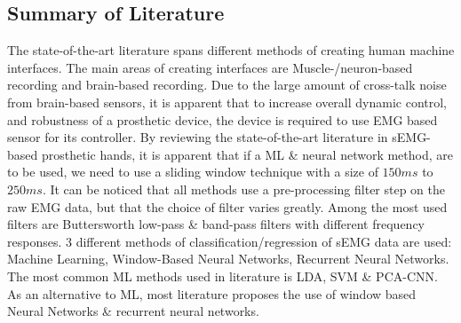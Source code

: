\documentclass[../main.tex]{subfiles}
\begin{document}


\subsection{Summary of Literature}

The state-of-the-art literature spans different methods of creating human machine interfaces.
The main areas of creating interfaces are Muscle-/neuron-based recording and brain-based recording.
Due to the large amount of cross-talk noise from brain-based sensors, it is apparent that to increase overall dynamic control, and robustness of a prosthetic device, the device is required to use EMG based sensor for its controller.
By reviewing the state-of-the-art literature in sEMG-based prosthetic hands, it is apparent that if a \gls{ML} \& neural network method, are to be used, we need to use a sliding window technique with a size of $150ms$ to $250ms$.
It can be noticed that all methods use a pre-processing filter step on the raw EMG data, but that the choice of filter varies greatly.
Among the most used filters are Buttersworth low-pass \& band-pass filters with different frequency responses.
3 different methods of classification/regression of sEMG data are used: Machine Learning, Window-Based Neural Networks, Recurrent Neural Networks.
The most common ML methods used in literature is \gls{LDA}, \gls{SVM} \& PCA-CNN.
As an alternative to ML, most literature proposes the use of window based Neural Networks \& recurrent neural networks.
\end{document}
